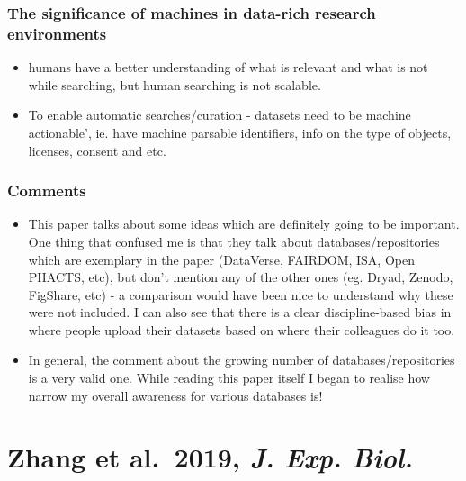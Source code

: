 \documentclass[
]{book}
\providecommand{\tightlist}{%
  \setlength{\itemsep}{0pt}\setlength{\parskip}{0pt}}
\begin{document}
\hypertarget{the-significance-of-machines-in-data-rich-research-environments}{%
\subsection{The significance of machines in data-rich research environments}\label{the-significance-of-machines-in-data-rich-research-environments}}

\begin{itemize}
\tightlist
\item
  humans have a better understanding of what is relevant and what is not while searching, but human searching is not scalable.
\item
  To enable automatic searches/curation - datasets need to be machine actionable', ie. have machine parsable identifiers, info on the type of objects, licenses, consent and etc.
\end{itemize}

\hypertarget{comments}{%
\subsection{Comments}\label{comments}}

\begin{itemize}
\tightlist
\item
  This paper talks about some ideas which are definitely going to be important. One thing that confused me is that they talk about databases/repositories which are exemplary in the paper (DataVerse, FAIRDOM, ISA, Open PHACTS, etc), but don't mention any of the other ones (eg. Dryad, Zenodo, FigShare, etc) - a comparison would have been nice to understand why these were not included. I can also see that there is a clear discipline-based bias in where people upload their datasets based on where their colleagues do it too.
\item
  In general, the comment about the growing number of databases/repositories is a very valid one. While reading this paper itself I began to realise how narrow my overall awareness for various databases is!
\end{itemize}

\hypertarget{zhang-et-al.-2019-j.-exp.-biol.}{%
\chapter{\texorpdfstring{Zhang et al.~2019, \emph{J. Exp. Biol.}}{Zhang et al.~2019, J. Exp. Biol.}}\label{zhang-et-al.-2019-j.-exp.-biol.}}
\end{document}
